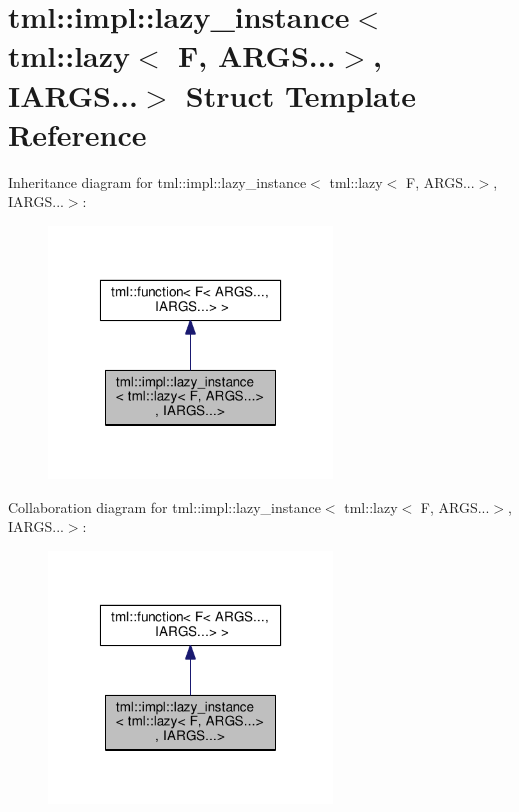 \hypertarget{structtml_1_1impl_1_1lazy__instance_3_01tml_1_1lazy_3_01_f_00_01_a_r_g_s_8_8_8_4_00_01_i_a_r_g_s_8_8_8_4}{\section{tml\+:\+:impl\+:\+:lazy\+\_\+instance$<$ tml\+:\+:lazy$<$ F, A\+R\+G\+S...$>$, I\+A\+R\+G\+S...$>$ Struct Template Reference}
\label{structtml_1_1impl_1_1lazy__instance_3_01tml_1_1lazy_3_01_f_00_01_a_r_g_s_8_8_8_4_00_01_i_a_r_g_s_8_8_8_4}
}


Inheritance diagram for tml\+:\+:impl\+:\+:lazy\+\_\+instance$<$ tml\+:\+:lazy$<$ F, A\+R\+G\+S...$>$, I\+A\+R\+G\+S...$>$\+:
\nopagebreak
\begin{figure}[H]
\begin{center}
\leavevmode
\includegraphics[width=214pt]{structtml_1_1impl_1_1lazy__instance_3_01tml_1_1lazy_3_01_f_00_01_a_r_g_s_8_8_8_4_00_01_i_a_r_g_s_8_8_8_4__inherit__graph}
\end{center}
\end{figure}


Collaboration diagram for tml\+:\+:impl\+:\+:lazy\+\_\+instance$<$ tml\+:\+:lazy$<$ F, A\+R\+G\+S...$>$, I\+A\+R\+G\+S...$>$\+:
\nopagebreak
\begin{figure}[H]
\begin{center}
\leavevmode
\includegraphics[width=214pt]{structtml_1_1impl_1_1lazy__instance_3_01tml_1_1lazy_3_01_f_00_01_a_r_g_s_8_8_8_4_00_01_i_a_r_g_s_8_8_8_4__coll__graph}
\end{center}
\end{figure}
